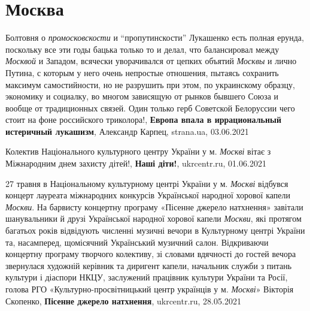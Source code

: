  
 
 
 
 
\chapter{Москва}

Болтовня о \emph{промосковскости} и \enquote{пропутинскости} Лукашенко есть полная ерунда,
поскольку все эти годы бацька только то и делал, что балансировал между \emph{Москвой}
и Западом, всячески уворачивался от цепких объятий \emph{Москвы} и лично Путина, с
которым у него очень непростые отношения, пытаясь сохранить максимум
самостийности, но не разрушить при этом, по украинскому образцу, экономику и
социалку, во многом зависящую от рынков бывшего Союза и вообще от традиционных
связей. Один только герб Советской Белоруссии чего стоит на фоне российского
триколора!,
\textbf{Европа впала в иррациональный истеричный лукашизм}, Александр Карпец,
strana.ua, 03.06.2021

Колектив Національного культурного центру України у м. \emph{Москві} вітає з Міжнародним днем захисту дітей!, 
\textbf{Наші діти!}, ukrcentr.ru, 01.06.2021

27 травня в Національному культурному центрі України у м. \emph{Москві} відбувся
концерт лауреата міжнародних конкурсів Української народної хорової капели
\emph{Москви}. На барвисту концертну програму «Пісенне джерело натхнення» завітали
шанувальники й друзі Української народної хорової капели \emph{Москви}, які протягом
багатьох років відвідують численні музичні вечори в Культурному центрі України
та, насамперед, щомісячний Український музичний салон. Відкриваючи концертну
програму творчого колективу, зі словами вдячності до гостей вечора звернулася
художній керівник та диригент капели, начальник служби з питань культури і
діаспори НКЦУ, заслужений працівник культури України та Росії, голова РГО
«Культурно-просвітницький центр українців у м. \emph{Москві}» Вікторія Скопенко,
\textbf{Пісенне джерело натхнення}, ukrcentr.ru, 28.05.2021

